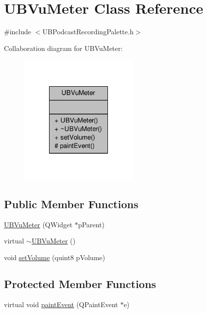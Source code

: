 \hypertarget{class_u_b_vu_meter}{\section{U\-B\-Vu\-Meter Class Reference}
\label{d5/d04/class_u_b_vu_meter}
}


{\ttfamily \#include $<$U\-B\-Podcast\-Recording\-Palette.\-h$>$}



Collaboration diagram for U\-B\-Vu\-Meter\-:
\nopagebreak
\begin{figure}[H]
\begin{center}
\leavevmode
\includegraphics[width=168pt]{d7/dde/class_u_b_vu_meter__coll__graph}
\end{center}
\end{figure}
\subsection*{Public Member Functions}
\begin{DoxyCompactItemize}
\item 
\hyperlink{class_u_b_vu_meter_a13db7347b4fb3c7181471ef098eb4611}{U\-B\-Vu\-Meter} (Q\-Widget $\ast$p\-Parent)
\item 
virtual \hyperlink{class_u_b_vu_meter_a2a806ad0666953fb09a10659f9890928}{$\sim$\-U\-B\-Vu\-Meter} ()
\item 
void \hyperlink{class_u_b_vu_meter_a7c4ac9a80c71b8ac31297cde237eca45}{set\-Volume} (quint8 p\-Volume)
\end{DoxyCompactItemize}
\subsection*{Protected Member Functions}
\begin{DoxyCompactItemize}
\item 
virtual void \hyperlink{class_u_b_vu_meter_a2beb2169c4b26fa2c8d78edc713135e6}{paint\-Event} (Q\-Paint\-Event $\ast$e)
\end{DoxyCompactItemize}


